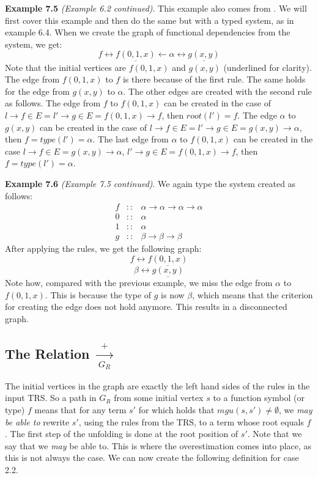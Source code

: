 \textbf{Example 7.5} \textit{(Example 6.2 continued)}. This example also comes from \cite{Payet:Unfolding}. We will first cover this example and then do the same but with a typed system, as in example 6.4. When we create the graph of functional dependencies from the system, we get:
\[
f \longleftrightarrow \underline{f(0, 1, x)} \longleftarrow \alpha \longleftrightarrow \underline{g(x,y)}
\]
Note that the initial vertices are $f(0, 1, x)$ and $g(x, y)$ (underlined for clarity). The edge from $f(0, 1, x)$ to $f$ is there because of the first rule. The same holds for the edge from $g(x, y)$ to $\alpha$. The other edges are created with the second rule as follows. The edge from $f$ to $f(0, 1, x)$ can be created in the case of $l \rightarrow f \in E = l' \rightarrow g \in E = f(0, 1, x) \rightarrow f$, then $\textit{root}(l') = f$. The edge $\alpha$ to $g(x, y)$ can be created in the case of $l \rightarrow f \in E = l' \rightarrow g \in E = g(x, y) \rightarrow \alpha$, then $f = \textit{type}(l') = \alpha$. The last edge from $\alpha$ to $f(0, 1, x)$ can be created in the case $l \rightarrow f \in E = g(x, y) \rightarrow \alpha$, $l' \rightarrow g \in E = f(0, 1, x) \rightarrow f$, then $f = \textit{type}(l') = \alpha$. 

\textbf{Example 7.6} \textit{(Example 7.5 continued)}. We again type the system created as follows:
\[
\begin{array}{rcl}
    f & :: & \alpha \rightarrow \alpha \rightarrow \alpha \rightarrow \alpha \\
    0 & :: & \alpha \\
    1 & :: & \alpha \\
    g & :: & \beta \rightarrow \beta \rightarrow \beta 
\end{array}
\]
After applying the rules, we get the following graph:
\[
f \longleftrightarrow \underline{f(0, 1, x)} 
\]
\[
\beta \longleftrightarrow \underline{g(x,y)}
\]
Note how, compared with the previous example, we miss the edge from $\alpha$ to $f(0, 1, x)$. This is because the type of $g$ is now $\beta$, which means that the criterion for creating the edge does not hold anymore. This results in a disconnected graph. 

\subsection{The Relation $\xrightarrow[G_R]{+}$}
The initial vertices in the graph are exactly the left hand sides of the rules in the input TRS. So a path in $G_R$ from some initial vertex $s$ to a function symbol (or type) $f$ means that for any term $s'$ for which holds that $\textit{mgu}(s, s') \neq \emptyset$, we \textit{may be able to} rewrite $s'$, using the rules from the TRS, to a term whose root equals $f$. The first step of the unfolding is done at the root position of $s'$. Note that we say that we \textit{may} be able to. This is where the overestimation comes into place, as this is not always the case. We can now create the following definition for case 2.2.

